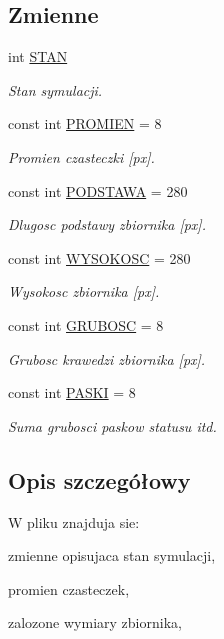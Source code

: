 \subsection*{Zmienne}
\begin{DoxyCompactItemize}
\item 
int \hyperlink{flagi_8hh_ae3a120c63186a17e4127a68187b3e9e8}{S\-T\-A\-N}
\begin{DoxyCompactList}\small\item\em Stan symulacji. \end{DoxyCompactList}\item 
const int \hyperlink{flagi_8hh_aa77f856f3142a9e81752665a9bc2e6de}{P\-R\-O\-M\-I\-E\-N} = 8
\begin{DoxyCompactList}\small\item\em Promien czasteczki \mbox{[}px\mbox{]}. \end{DoxyCompactList}\item 
const int \hyperlink{flagi_8hh_acd3c5814c051e565bf7854f6403acf49}{P\-O\-D\-S\-T\-A\-W\-A} = 280
\begin{DoxyCompactList}\small\item\em Dlugosc podstawy zbiornika \mbox{[}px\mbox{]}. \end{DoxyCompactList}\item 
const int \hyperlink{flagi_8hh_a073767f0ac7dbf009a42b00de1092b52}{W\-Y\-S\-O\-K\-O\-S\-C} = 280
\begin{DoxyCompactList}\small\item\em Wysokosc zbiornika \mbox{[}px\mbox{]}. \end{DoxyCompactList}\item 
const int \hyperlink{flagi_8hh_a359a95636f17b8e9b7a01389d75b521d}{G\-R\-U\-B\-O\-S\-C} = 8
\begin{DoxyCompactList}\small\item\em Grubosc krawedzi zbiornika \mbox{[}px\mbox{]}. \end{DoxyCompactList}\item 
const int \hyperlink{flagi_8hh_afa380d01dc08ee237b4eea9046704397}{P\-A\-S\-K\-I} = 8
\begin{DoxyCompactList}\small\item\em Suma grubosci paskow statusu itd. \end{DoxyCompactList}\end{DoxyCompactItemize}


\subsection{Opis szczegółowy}
W pliku znajduja sie\-:
\begin{DoxyItemize}
\item zmienne opisujaca stan symulacji,
\item promien czasteczek,
\item zalozone wymiary zbiornika, 
\end{DoxyItemize}


